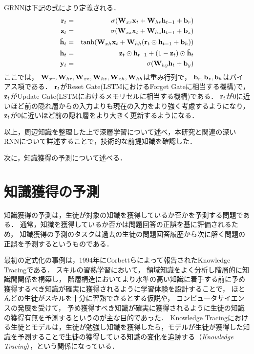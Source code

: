 GRNNは下記の式により定義される．
\begin{eqnarray}
\label{eq:grurnn1}
{\bf r}_t &=& \sigma({\bf W}_{xr}{\bf x}_t + {\bf W}_{hr}{\bf h}_{t-1} + {\bf b}_r)\\
\label{eq:grurnn2}
{\bf z}_t &=& \sigma({\bf W}_{xz}{\bf x}_t + {\bf W}_{hz}{\bf h}_{t-1} + {\bf b}_z)\\
\label{eq:grurnn3}
\tilde{{\bf h}}_t &=& \tanh({\bf W}_{xh}{\bf x}_t + {\bf W}_{hh}({\bf r}_t \odot {\bf h}_{t-1} + {\bf b}_h))\\
\label{eq:grurnn4}
{\bf h}_t &=& {\bf z}_t \odot {\bf h}_{t-1} + (1 - {\bf z}_t) \odot \tilde{{\bf h}}_t\\
\label{eq:grurnn5}
{\bf y}_t &=& \sigma( {\bf W}_{hy} {\bf h}_t + {\bf b}_y)
\end{eqnarray}
ここでは，
${\bf W}_{xr}, {\bf W}_{hr}, {\bf W}_{xz}, {\bf W}_{hz}, {\bf W}_{xh}, {\bf W}_{hh}$は重み行列で， 
${\bf b}_r, {\bf b}_z, {\bf b}_h$はバイアス項である．
${\bf r}_t$がReset Gate(LSTMにおけるForget Gateに相当する機構)で，  
${\bf z}_t$がUpdate Gate(LSTMにおけるメモリセルに相当する機構)である．
${\bf r}_t$が0に近いほど前の隠れ層からの入力よりも現在の入力をより強く考慮するようになり，
${\bf z}_t$が0に近いほど前の隠れ層をより大きく更新するようになる．


\vvspace


以上，周辺知識を整理した上で深層学習について述べ，本研究と関連の深いRNNについて詳述することで，技術的な前提知識を確認した．

次に，知識獲得の予測について述べる．



\section{知識獲得の予測}
知識獲得の予測は，生徒が対象の知識を獲得しているか否かを予測する問題である．
通常，知識を獲得しているか否かは問題回答の正誤を基に評価されるため，
知識獲得の予測のタスクは過去の生徒の問題回答履歴から次に解く問題の正誤を予測するというものである．

最初の定式化の事例は，1994年にCorbettらによって報告されたKnowledge Tracing\cite{corbett1994knowledge}である．
スキルの習熟学習において，
領域知識をよく分析し階層的に知識間関係を構築し，
階層構造においてより水準の高い知識に着手する前に予め獲得するべき知識が確実に獲得されるように学習体験を設計することで，
ほとんどの生徒がスキルを十分に習熟できるとする仮説\cite{keller1968good, bloom1968learning}や，
コンピュータサイエンスの発展を受けて，
予め獲得すべき知識が確実に獲得されるように生徒の知識の獲得有無を予測するというのが主な目的であった．
Knowledge Tracingにおける生徒とモデルは，生徒が勉強し知識を獲得したら，モデルが生徒が獲得した知識を予測することで生徒の獲得している知識の変化を追跡する（{\it Knowledge Tracing}），という関係になっている．


